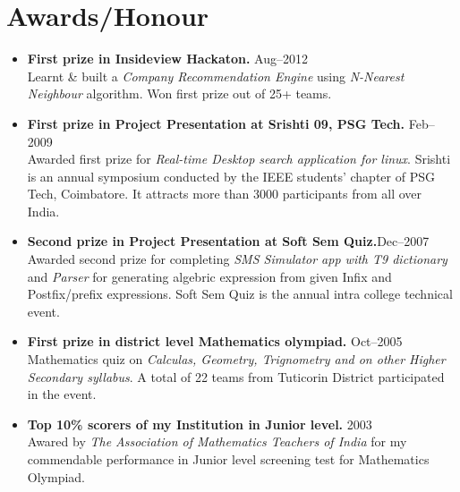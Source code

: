 \documentclass{cv}
\begin{document}
\section{Awards/Honour}
\begin{itemize}[label={$\ast$}]
  \item \textbf{First prize in Insideview Hackaton.} \hfill Aug--2012\\
    Learnt \& built a \textit{Company Recommendation Engine} using \textit{N-Nearest Neighbour} algorithm.  Won first prize out of 25+ teams.
  \item \textbf{First prize in Project Presentation at Srishti 09, PSG Tech.} \hfill Feb--2009\\
    Awarded first prize for \textit{Real-time Desktop search application for linux}. Srishti is an annual symposium conducted by the IEEE students' chapter of PSG Tech, Coimbatore.  It attracts more than 3000 participants from all over India.
  \item \textbf{Second prize in Project Presentation at Soft Sem Quiz.}\hfill Dec--2007\\
    Awarded second prize for completing \textit{SMS Simulator app with T9 dictionary} and \textit{Parser} for generating algebric expression from given Infix and Postfix/prefix expressions.  Soft Sem Quiz is the annual intra college technical event.
  \item \textbf{First prize in district level Mathematics olympiad.} \hfill Oct--2005\\
    Mathematics quiz on \textit{Calculas, Geometry, Trignometry and on other Higher Secondary syllabus}.  A total of 22 teams from Tuticorin District participated in the event.
  \item \textbf{Top 10\% scorers of my Institution in Junior level.} \hfill 2003\\
    Awared by \textit{The Association of Mathematics Teachers of India} for my commendable performance in Junior level screening test for Mathematics Olympiad.
\end{itemize}
\end{document}
